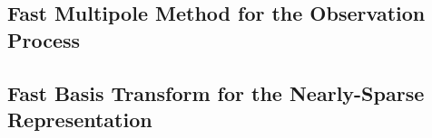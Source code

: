 \subsection{Fast Multipole Method for the Observation Process}
\label{subsec:imp_fmm_obs_process}


\subsection{Fast Basis Transform for the Nearly-Sparse Representation}


%
